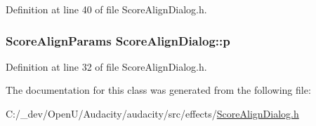 Definition at line 40 of file Score\+Align\+Dialog.\+h.

\subsubsection[{\texorpdfstring{p}{p}}]{\setlength{\rightskip}{0pt plus 5cm}Score\+Align\+Params Score\+Align\+Dialog\+::p}\hypertarget{class_score_align_dialog_abca25b3b674e42187c3ca190e6c03a5d}{}\label{class_score_align_dialog_abca25b3b674e42187c3ca190e6c03a5d}


Definition at line 32 of file Score\+Align\+Dialog.\+h.



The documentation for this class was generated from the following file\+:\begin{DoxyCompactItemize}
\item 
C\+:/\+\_\+dev/\+Open\+U/\+Audacity/audacity/src/effects/\hyperlink{_score_align_dialog_8h}{Score\+Align\+Dialog.\+h}\end{DoxyCompactItemize}

